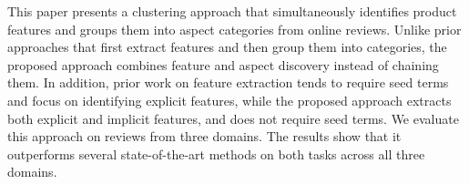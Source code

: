 This paper presents a clustering approach that simultaneously identifies product features and groups them into aspect categories from online reviews. Unlike prior approaches that first extract features and then group them into categories, the proposed approach combines feature and aspect discovery instead of chaining them. In addition, prior work on feature extraction tends to require seed terms and focus on identifying explicit features, while the proposed approach extracts both explicit and implicit features, and does not require seed terms. We evaluate this approach on reviews from three domains. The results show that it outperforms several state-of-the-art methods on both tasks across all three domains.
